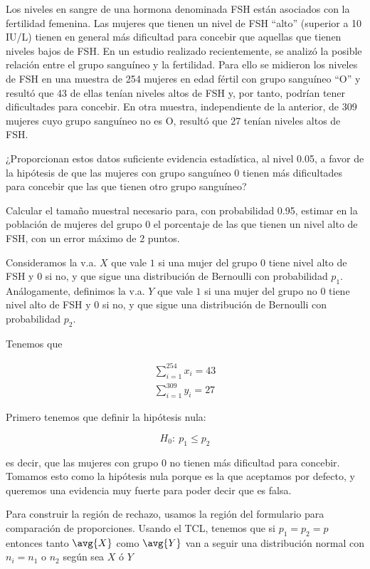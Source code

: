 \begin{problem}[4] Los niveles en sangre de una hormona denominada FSH están asociados con la fertilidad femenina. Las mujeres que tienen un nivel de FSH ``alto'' (superior a 10 IU/L) tienen en general más dificultad para concebir que aquellas que tienen niveles bajos de FSH. En un estudio realizado recientemente, se analizó la posible relación entre el grupo sanguíneo y la fertilidad. Para ello se midieron los niveles de FSH en una muestra de 254 mujeres en edad fértil con grupo sanguíneo ``O'' y resultó que 43 de ellas tenían niveles altos de FSH y, por tanto, podrían tener dificultades para concebir. En otra muestra, independiente de la anterior, de 309 mujeres cuyo grupo sanguíneo no es O, resultó que 27 tenían niveles altos de FSH. 

\ppart ¿Proporcionan estos datos suficiente evidencia estadística, al nivel 0.05, a favor de la hipótesis de que las mujeres con grupo sanguíneo 0 tienen más dificultades para concebir que las que tienen otro grupo sanguíneo?

\ppart Calcular el tamaño muestral necesario para, con probabilidad 0.95, estimar en la población de mujeres del grupo 0 el porcentaje de las que tienen un nivel alto de FSH, con un error máximo de 2 puntos.

\solution

Consideramos la v.a. $X$ que vale $1$ si una mujer del grupo 0 tiene nivel alto de FSH y 0 si no, y que sigue una distribución de Bernoulli con probabilidad $p_1$. Análogamente, definimos la v.a. $Y$ que vale $1$ si una mujer del grupo no 0 tiene nivel alto de FSH y 0 si no, y que sigue una distribución de Bernoulli con probabilidad $p_2$.

Tenemos que 

\begin{gather*}
\sum_{i=1}^{254} x_i = 43 \\
\sum_{i=1}^{309} y_i = 27 
\end{gather*}

\spart Primero tenemos que definir la hipótesis nula:

\[ H_0:\: p_1≤p_2 \]

es decir, que las mujeres con grupo 0 no tienen más dificultad para concebir. Tomamos esto como la hipótesis nula porque es la que aceptamos por defecto, y queremos una evidencia muy fuerte para poder decir que es falsa.

Para construir la región de rechazo, usamos la región del formulario para comparación de proporciones. Usando el TCL, tenemos que si $p_1=p_2=p$ entonces tanto $\avg{X}$ como $\avg{Y}$ van a seguir una distribución normal con $n_i = n_1$ o $n_2$ según sea $X$ ó $Y$


\end{problem}
